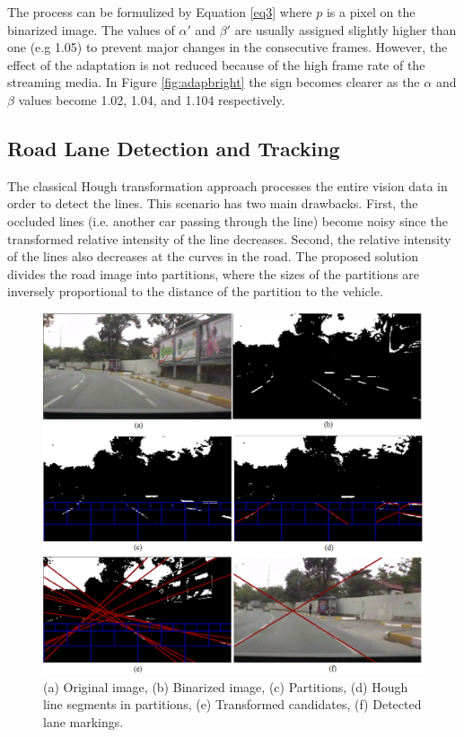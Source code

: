\documentclass[a4paper,oneside,12pt]{report}
\begin{document}
The process can be formulized by Equation \ref{eq3} where $p$ is a pixel on the binarized image. The values of $\alpha'$ and $\beta'$ are usually assigned slightly higher than one (e.g 1.05) to prevent major changes in the consecutive frames. However, the effect of the adaptation is not reduced because of the high frame rate of the streaming media. In Figure \ref{fig:adapbright} the sign becomes clearer as the $\alpha$ and $\beta$ values become 1.02, 1.04, and 1.104 respectively.
\subsection{Road Lane Detection and Tracking}
The classical Hough transformation approach processes the entire vision data in order to detect the lines. This scenario has two main drawbacks. First, the occluded lines (i.e. another car passing through the line) become noisy since the transformed relative intensity of the line decreases. Second, the relative intensity of the lines also decreases at the curves in the road. The proposed solution divides the road image into partitions, where the sizes of the partitions are inversely proportional to the distance of the partition to the vehicle.
\begin{figure}[ht]
\begin{center}
\includegraphics[width=140mm]{img/ldfigmain.eps}
\caption{(a) Original image, (b) Binarized image, (c) Partitions, (d) Hough line segments in partitions, (e) Transformed candidates, (f) Detected lane markings. }
\label{fig:ldfigmain}
\end{center}
\end{figure}
\end{document}
